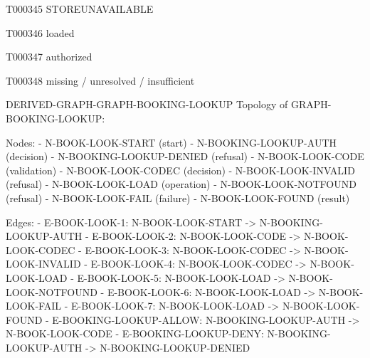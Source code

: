 \documentclass[11pt,a4paper]{article}
\begin{document}
\begin{atlastext}{T000345}
STORE\AtlasCharUnderscore{}UNAVAILABLE
\end{atlastext}
\begin{atlastext}{T000346}
loaded
\end{atlastext}
\begin{atlastext}{T000347}
authorized
\end{atlastext}
\begin{atlastext}{T000348}
missing / unresolved / insufficient
\end{atlastext}
\par\noindent\begin{minipage}{\linewidth}
\begin{atlasderived}{DERIVED-GRAPH-GRAPH-BOOKING-LOOKUP}
Topology of GRAPH-BOOKING-LOOKUP:

Nodes:
- N-BOOK-LOOK-START (start)
- N-BOOKING-LOOKUP-AUTH (decision)
- N-BOOKING-LOOKUP-DENIED (refusal)
- N-BOOK-LOOK-CODE (validation)
- N-BOOK-LOOK-CODEC (decision)
- N-BOOK-LOOK-INVALID (refusal)
- N-BOOK-LOOK-LOAD (operation)
- N-BOOK-LOOK-NOTFOUND (refusal)
- N-BOOK-LOOK-FAIL (failure)
- N-BOOK-LOOK-FOUND (result)

Edges:
- E-BOOK-LOOK-1: N-BOOK-LOOK-START -> N-BOOKING-LOOKUP-AUTH
- E-BOOK-LOOK-2: N-BOOK-LOOK-CODE -> N-BOOK-LOOK-CODEC
- E-BOOK-LOOK-3: N-BOOK-LOOK-CODEC -> N-BOOK-LOOK-INVALID
- E-BOOK-LOOK-4: N-BOOK-LOOK-CODEC -> N-BOOK-LOOK-LOAD
- E-BOOK-LOOK-5: N-BOOK-LOOK-LOAD -> N-BOOK-LOOK-NOTFOUND
- E-BOOK-LOOK-6: N-BOOK-LOOK-LOAD -> N-BOOK-LOOK-FAIL
- E-BOOK-LOOK-7: N-BOOK-LOOK-LOAD -> N-BOOK-LOOK-FOUND
- E-BOOKING-LOOKUP-ALLOW: N-BOOKING-LOOKUP-AUTH -> N-BOOK-LOOK-CODE
- E-BOOKING-LOOKUP-DENY: N-BOOKING-LOOKUP-AUTH -> N-BOOKING-LOOKUP-DENIED
\end{atlasderived}
\end{minipage}\par
\end{document}
